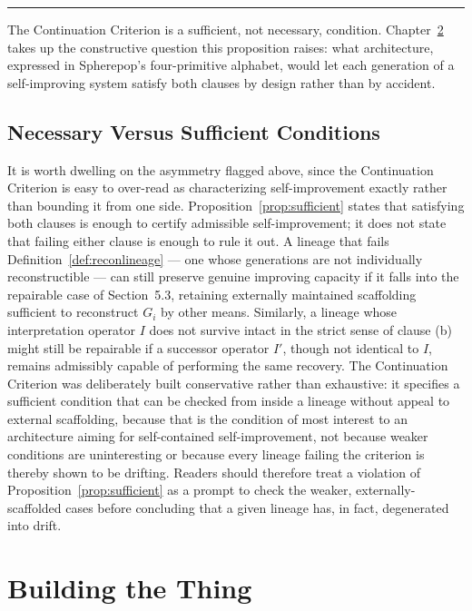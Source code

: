 \documentclass[11pt]{book}
\begin{document}
\begin{center}
\rule{0.4\linewidth}{0.4pt}
\end{center}

The Continuation Criterion is a sufficient, not necessary, condition. Chapter~\ref{ch:building} takes up the constructive question this proposition raises: what architecture, expressed in Spherepop's four-primitive alphabet, would let each generation of a self-improving system satisfy both clauses by design rather than by accident.

\section{Necessary Versus Sufficient Conditions}

It is worth dwelling on the asymmetry flagged above, since the Continuation Criterion is easy to over-read as characterizing self-improvement exactly rather than bounding it from one side. Proposition~\ref{prop:sufficient} states that satisfying both clauses is enough to certify admissible self-improvement; it does not state that failing either clause is enough to rule it out. A lineage that fails Definition~\ref{def:reconlineage} --- one whose generations are not individually reconstructible --- can still preserve genuine improving capacity if it falls into the repairable case of Section~5.3, retaining externally maintained scaffolding sufficient to reconstruct $G_i$ by other means. Similarly, a lineage whose interpretation operator $I$ does not survive intact in the strict sense of clause (b) might still be repairable if a successor operator $I'$, though not identical to $I$, remains admissibly capable of performing the same recovery. The Continuation Criterion was deliberately built conservative rather than exhaustive: it specifies a sufficient condition that can be checked from inside a lineage without appeal to external scaffolding, because that is the condition of most interest to an architecture aiming for self-contained self-improvement, not because weaker conditions are uninteresting or because every lineage failing the criterion is thereby shown to be drifting. Readers should therefore treat a violation of Proposition~\ref{prop:sufficient} as a prompt to check the weaker, externally-scaffolded cases before concluding that a given lineage has, in fact, degenerated into drift.

\chapter{Building the Thing}
\label{ch:building}
\end{document}
